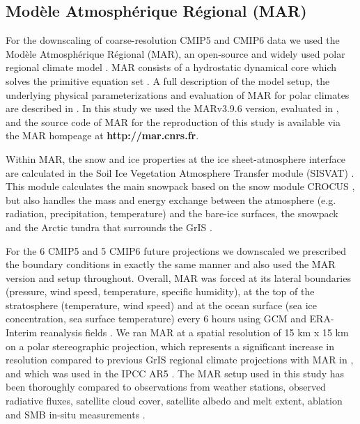 \documentclass[12pt]{article}
\begin{document}
\subsection*{Modèle Atmosphérique Régional (MAR)}
For the downscaling of coarse-resolution CMIP5 and CMIP6 data we used the Modèle Atmosphérique Régional (MAR), an open-source and widely used polar regional climate model
\cite{Fettweis2007,Fettweis2013,Fettweis2017,Gallee1994,Gallee1995,Hofer2017,Hofer2019,Kittel2018, Delhasse2018,Lang2015, Agosta2019}. MAR consists of a hydrostatic dynamical core which solves the primitive equation set \cite{Gallee1994,Gallee1995}. A full description of the model setup, the underlying physical parameterizations and evaluation of MAR for polar climates are described in \cite{Gallee1994,Gallee1995,Fettweis2007,Fettweis2017,Hofer2017,Hofer2019,Kittel2018,Agosta2019}. In this study we used the MARv3.9.6 version, evaluated in \textcite{Delhasse2019}, and the source code of MAR for the reproduction of this study is available via the MAR hompeage at \textbf{http://mar.cnrs.fr}.

Within MAR, the snow and ice properties at the ice sheet-atmosphere interface are calculated in the Soil Ice Vegetation Atmosphere Transfer module (SISVAT) \cite{Gallee1994}. This module calculates the main snowpack based on the snow module CROCUS \cite{Gallee2001,Vionnet2012}, but also handles the mass and energy exchange between the atmosphere (e.g. radiation, precipitation, temperature) and the bare-ice surfaces, the snowpack and the Arctic tundra that surrounds the GrIS \cite{Gallee1994,Fettweis2007}.

For the 6 CMIP5 and 5 CMIP6 future projections we downscaled we prescribed the boundary conditions in exactly the same manner and also used the MAR version and setup throughout. Overall, MAR was forced at its lateral boundaries (pressure, wind speed, temperature, specific humidity), at the top of the stratosphere (temperature, wind speed) and at the ocean surface (sea ice concentration, sea surface temperature) every 6 hours using GCM and ERA-Interim reanalysis fields \cite{Agosta2019,Kittel2018,Fettweis2007,Fettweis2013}. We ran MAR at a spatial resolution of 15 km x 15 km on a polar stereographic projection, which represents a significant increase in resolution compared to previous GrIS regional climate projections with MAR in \textcite{Fettweis2013}, and which was used in the IPCC AR5 \cite{IPCC2014}. The MAR setup used in this study has been thoroughly compared to observations from weather stations, observed radiative fluxes, satellite cloud cover, satellite albedo and melt extent, ablation and SMB in-situ measurements \cite{Tedesco2019,Fettweis2007,Fettweis2017,Hofer2017,Delhasse2019}. 
\end{document}
